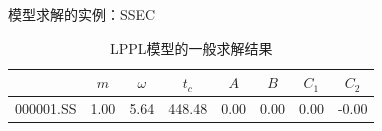 \begin{frame}[t]{模型求解的实例：SSEC}
    \begin{figure}[H]
    \end{figure}
    \begin{table}[H]
        \begin{tabular}{@{}lccccccc@{}}
        \toprule
                               & $m$  & $\omega$ & $t_c$  & $A$              & $B$             & $C_1$      & $C_2$         \\ \midrule
        000001.SS & 1.00 & 5.64     & 448.48 & 0.00 & 0.00 & 0.00 & -0.00 \\ \bottomrule
        \end{tabular}
        \caption{LPPL模型的一般求解结果}\label{T:Solution-1}
    \end{table}
\end{frame}

